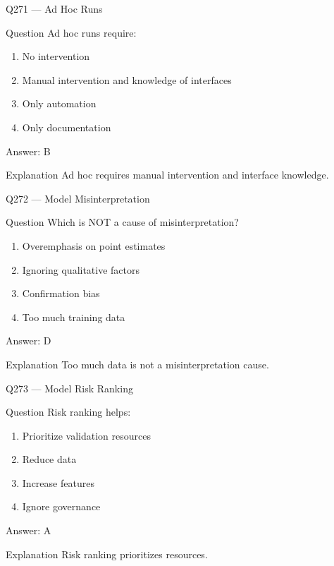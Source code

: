 \documentclass[aspectratio=169,8pt]{beamer}
\begin{document}
\begin{frame}{Q271 --- Ad Hoc Runs}
\begin{block}{Question}
Ad hoc runs require:
\begin{enumerate}
\item No intervention
\item Manual intervention and knowledge of interfaces
\item Only automation
\item Only documentation
\end{enumerate}
\end{block}
\begin{exampleblock}{Answer: B}\end{exampleblock}
\begin{block}{Explanation}
Ad hoc requires manual intervention and interface knowledge.
\end{block}
\end{frame}

\begin{frame}{Q272 --- Model Misinterpretation}
\begin{block}{Question}
Which is NOT a cause of misinterpretation?
\begin{enumerate}
\item Overemphasis on point estimates
\item Ignoring qualitative factors
\item Confirmation bias
\item Too much training data
\end{enumerate}
\end{block}
\begin{exampleblock}{Answer: D}\end{exampleblock}
\begin{block}{Explanation}
Too much data is not a misinterpretation cause.
\end{block}
\end{frame}

\begin{frame}{Q273 --- Model Risk Ranking}
\begin{block}{Question}
Risk ranking helps:
\begin{enumerate}
\item Prioritize validation resources
\item Reduce data
\item Increase features
\item Ignore governance
\end{enumerate}
\end{block}
\begin{exampleblock}{Answer: A}\end{exampleblock}
\begin{block}{Explanation}
Risk ranking prioritizes resources.
\end{block}
\end{frame}
\end{document}
